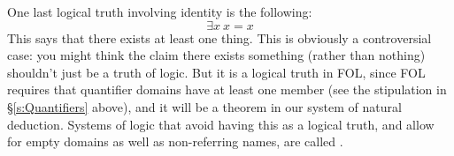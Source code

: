 One last logical truth involving identity is the following:
$$\exists x \ x=x$$
This says that there exists at least one thing. This is obviously a controversial case: you might think the claim there exists something (rather than nothing) shouldn't just be a truth of logic.  But it is a logical truth in FOL, since FOL requires that quantifier domains have at least one member (see the stipulation in \S \ref{s:Quantifiers} above), and it will be a theorem in our system of natural deduction.  Systems of logic that avoid having this as a logical truth, and allow for empty domains as well as non-referring names, are called .

\practiceproblems



